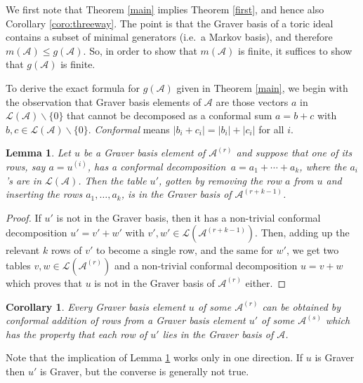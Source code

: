 \documentclass[11pt]{amsart}
\newtheorem{lemma}[theorem]{Lemma}
\newtheorem{corollary}[theorem]{Corollary}
\theoremstyle{definition}
\renewcommand{\L}{{\mathcal L}}
\newcommand{\A}{{\mathcal A}}
\begin{document}
We first note that Theorem \ref{main} implies
Theorem \ref{first}, and hence also Corollary \ref{coro:threeway}.
The point is that the Graver basis of a toric ideal contains
a subset of minimal generators (i.e.~a Markov basis), and therefore
$m(\A) \leq g(\A)$. So, in order to show that
$m(\A)$ is finite, it suffices to show that
$g(\A)$ is finite.

To derive the exact formula for $g(\A)$  given
in Theorem  \ref{main}, we begin with the observation
that Graver basis elements of $\A$ are those
vectors $a$ in $\L(\A) \backslash \{0\}$ that cannot be decomposed
as a conformal sum $a=b+c$ with $b,c\in\L(\A)\backslash \{0\}$.
{\em Conformal} means $|b_i+c_i| = |b_i| + |c_i|$ for all $i$.

\begin{lemma}
\label{lem:decompose}
Let $u$ be a Graver basis element of $\A^{(r)}$ and
suppose that one of its rows, say $ a = u^{(i)}$,
has a conformal decomposition
$\,a =a_1+\cdots + a_k$, where the $a_i$'s are in $\L(\A)$.
Then the table $u'$,  gotten by removing the row $a$ from $u$ and
inserting the rows $a_1,\dots,a_k$,
is in the Graver basis of $\A^{(r+k-1)}$.
\end{lemma}


\begin{proof}
If $u'$ is not in the Graver basis, then it has a non-trivial
conformal decomposition
$u'=v' + w'$ with $v',w'\in\L(\A^{(r+k-1)})$.
Then, adding up the relevant $k$ rows of $v'$ to become a single row,
and the same for $w'$,
we get two tables $v,w\in\L(\A^{(r)})$ and a
non-trivial conformal decomposition
$u=v+w$ which proves that $u$ is not in the Graver basis
of $\A^{(r)}$ either.
\end{proof}

\begin{corollary}
\label{crucial}
Every Graver basis element $u$ of some $\A^{(r)}$ can be obtained by
conformal addition of rows from a Graver basis element $u'$
of some $\A^{(s)}$ which has the property
that each row of $u'$ lies in the Graver basis of $\A$.
\end{corollary}

Note that the implication of Lemma \ref{lem:decompose}
works only in one direction.
If $u$ is Graver then $u'$ is Graver,
but the converse is generally not true.
\end{document}
